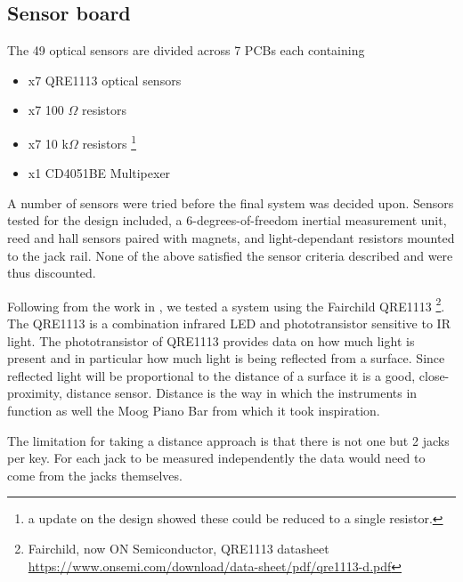 \subsection{Sensor board}\label{sensor-board}

The 49 optical sensors are divided across 7 PCBs each containing

\begin{itemize}
\item
  x7 QRE1113 optical sensors
\item
  x7 100 $\Omega$ resistors
\item
  x7 10 k$\Omega$ resistors \footnote{a update on the design showed these could be reduced to a single resistor.}
\item
  x1 CD4051BE Multipexer
\end{itemize}

A number of sensors were tried before the final system was decided upon. 
Sensors tested for the design included, a 6-degrees-of-freedom inertial measurement unit, reed and hall sensors paired with magnets, and light-dependant resistors mounted to the jack rail.
None of the above satisfied the sensor criteria described and were thus discounted.

Following from the work in \cite{McPherson2013, McPherson2019}, we tested
a system using the Fairchild QRE1113 \footnote{Fairchild, now ON Semiconductor, QRE1113 datasheet \url{https://www.onsemi.com/download/data-sheet/pdf/qre1113-d.pdf}}. The
QRE1113 is a combination infrared LED and phototransistor sensitive to
IR light. The phototransistor of QRE1113 provides data on how much light
is present and in particular how much light is being reflected from a
surface. Since reflected light will be proportional to the distance of
a surface it is a good, close-proximity, distance sensor. Distance is
the way in which the instruments in \cite{McPherson2013, McPherson2019}
function as well the Moog Piano Bar from which it took inspiration.

The limitation for taking a distance approach is that there is not one
but 2 jacks per key. For each jack to be measured independently the data
would need to come from the jacks themselves.


